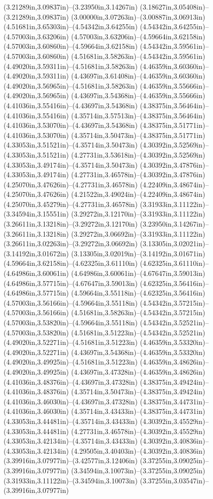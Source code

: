 (3.21289in,3.09837in)--(3.23950in,3.14267in) (3.18627in,3.05408in)--(3.21289in,3.09837in) (3.00000in,3.07263in)--(3.00887in,3.06913in) (4.51681in,3.65303in)--(4.54342in,3.64255in) (4.54342in,3.64255in)--(4.57003in,3.63206in) (4.57003in,3.63206in)--(4.59664in,3.62158in) (4.57003in,3.60860in)--(4.59664in,3.62158in) (4.54342in,3.59561in)--(4.57003in,3.60860in) (4.51681in,3.58263in)--(4.54342in,3.59561in) (4.49020in,3.59311in)--(4.51681in,3.58263in) (4.46359in,3.60360in)--(4.49020in,3.59311in) (4.43697in,3.61408in)--(4.46359in,3.60360in) (4.49020in,3.56965in)--(4.51681in,3.58263in) (4.46359in,3.55666in)--(4.49020in,3.56965in) (4.43697in,3.54368in)--(4.46359in,3.55666in) (4.41036in,3.55416in)--(4.43697in,3.54368in) (4.38375in,3.56464in)--(4.41036in,3.55416in) (4.35714in,3.57513in)--(4.38375in,3.56464in) (4.41036in,3.53070in)--(4.43697in,3.54368in) (4.38375in,3.51771in)--(4.41036in,3.53070in) (4.35714in,3.50473in)--(4.38375in,3.51771in) (4.33053in,3.51521in)--(4.35714in,3.50473in) (4.30392in,3.52569in)--(4.33053in,3.51521in) (4.27731in,3.53618in)--(4.30392in,3.52569in) (4.33053in,3.49174in)--(4.35714in,3.50473in) (4.30392in,3.47876in)--(4.33053in,3.49174in) (4.27731in,3.46578in)--(4.30392in,3.47876in) (4.25070in,3.47626in)--(4.27731in,3.46578in) (4.22409in,3.48674in)--(4.25070in,3.47626in) (4.21522in,3.49024in)--(4.22409in,3.48674in) (4.25070in,3.45279in)--(4.27731in,3.46578in) (3.31933in,3.11122in)--(3.34594in,3.15551in) (3.29272in,3.12170in)--(3.31933in,3.11122in) (3.26611in,3.13218in)--(3.29272in,3.12170in) (3.23950in,3.14267in)--(3.26611in,3.13218in) (3.29272in,3.06692in)--(3.31933in,3.11122in) (3.26611in,3.02263in)--(3.29272in,3.06692in) (3.13305in,3.02021in)--(3.14192in,3.01672in) (3.13305in,3.02019in)--(3.14192in,3.01671in) (4.59664in,3.62158in)--(4.62325in,3.61110in) (4.62325in,3.61110in)--(4.64986in,3.60061in) (4.64986in,3.60061in)--(4.67647in,3.59013in) (4.64986in,3.57715in)--(4.67647in,3.59013in) (4.62325in,3.56416in)--(4.64986in,3.57715in) (4.59664in,3.55118in)--(4.62325in,3.56416in) (4.57003in,3.56166in)--(4.59664in,3.55118in) (4.54342in,3.57215in)--(4.57003in,3.56166in) (4.51681in,3.58263in)--(4.54342in,3.57215in) (4.57003in,3.53820in)--(4.59664in,3.55118in) (4.54342in,3.52521in)--(4.57003in,3.53820in) (4.51681in,3.51223in)--(4.54342in,3.52521in) (4.49020in,3.52271in)--(4.51681in,3.51223in) (4.46359in,3.53320in)--(4.49020in,3.52271in) (4.43697in,3.54368in)--(4.46359in,3.53320in) (4.49020in,3.49925in)--(4.51681in,3.51223in) (4.46359in,3.48626in)--(4.49020in,3.49925in) (4.43697in,3.47328in)--(4.46359in,3.48626in) (4.41036in,3.48376in)--(4.43697in,3.47328in) (4.38375in,3.49424in)--(4.41036in,3.48376in) (4.35714in,3.50473in)--(4.38375in,3.49424in) (4.41036in,3.46030in)--(4.43697in,3.47328in) (4.38375in,3.44731in)--(4.41036in,3.46030in) (4.35714in,3.43433in)--(4.38375in,3.44731in) (4.33053in,3.44481in)--(4.35714in,3.43433in) (4.30392in,3.45529in)--(4.33053in,3.44481in) (4.27731in,3.46578in)--(4.30392in,3.45529in) (4.33053in,3.42134in)--(4.35714in,3.43433in) (4.30392in,3.40836in)--(4.33053in,3.42134in) (4.29505in,3.40403in)--(4.30392in,3.40836in) (3.39916in,3.07977in)--(3.42577in,3.12406in) (3.37255in,3.09025in)--(3.39916in,3.07977in) (3.34594in,3.10073in)--(3.37255in,3.09025in) (3.31933in,3.11122in)--(3.34594in,3.10073in) (3.37255in,3.03547in)--(3.39916in,3.07977in) 